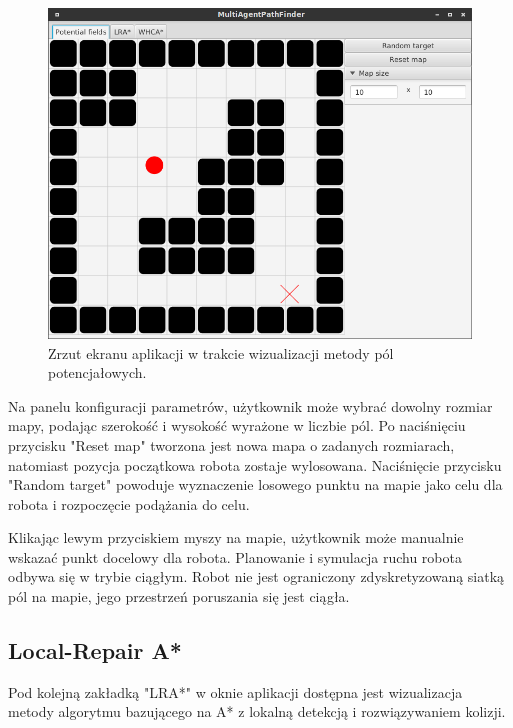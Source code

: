 \begin{figure}
	\centering
	\includegraphics[width=0.8\columnwidth]{img/robopath/ui-fields}
	\caption{Zrzut ekranu aplikacji w trakcie wizualizacji metody pól potencjałowych.}
	\label{fig:robopath-ui-fields}
\end{figure}

Na panelu konfiguracji parametrów, użytkownik może wybrać dowolny rozmiar mapy, podając szerokość i wysokość wyrażone w liczbie pól.
Po naciśnięciu przycisku "Reset map" tworzona jest nowa mapa o zadanych rozmiarach, natomiast pozycja początkowa robota zostaje wylosowana.
Naciśnięcie przycisku "Random target" powoduje wyznaczenie losowego punktu na mapie jako celu dla robota i rozpoczęcie podążania do celu.

Klikając lewym przyciskiem myszy na mapie, użytkownik może manualnie wskazać punkt docelowy dla robota.
Planowanie i symulacja ruchu robota odbywa się w trybie ciągłym. Robot nie jest ograniczony zdyskretyzowaną siatką pól na mapie, jego przestrzeń poruszania się jest ciągła.

\subsection{Local-Repair A*}
\label{ch:app-lra}
Pod kolejną zakładką "LRA*" w oknie aplikacji dostępna jest wizualizacja metody algorytmu bazującego na A* z lokalną detekcją i rozwiązywaniem kolizji.

